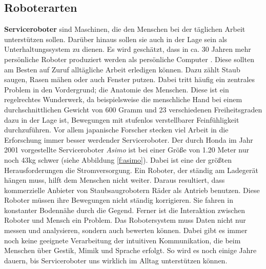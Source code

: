 \subsection{Roboterarten}
\textbf{Serviceroboter} sind Maschinen, die den Menschen bei der täglichen Arbeit unterstützen sollen. Darüber hinaus sollen sie auch in der Lage sein als Unterhaltungssystem zu dienen. Es wird geschätzt, dass in ca. 30 Jahren mehr persönliche Roboter produziert werden als persönliche Computer \cite{Haun2007}.
Diese sollten am Besten auf Zuruf alltägliche Arbeit erledigen können. Dazu zählt Staub saugen, Rasen mähen oder auch Fenster putzen. Dabei tritt häufig ein zentrales Problem in den Vordergrund; die Anatomie des Menschen. Diese ist ein regelrechtes Wunderwerk, da beispielsweise die menschliche Hand bei einem durchschnittlichen Gewicht von 600 Gramm und 23 verschiedenen Freiheitsgraden dazu in der Lage ist, Bewegungen mit stufenlos verstellbarer Feinfühligkeit durchzuführen. Vor allem japanische Forscher stecken viel Arbeit in die Erforschung immer besser werdender Serviceroboter. Der durch Honda im Jahr 2001 vorgestellte Serviceroboter \textit{Asimo} ist bei einer Größe von 1.20 Meter nur noch 43kg schwer (siehe Abbildung \ref{f:asimo}).
Dabei ist eine der größten Herausforderungen die Stromversorgung. Ein Roboter, der ständig am Ladegerät hängen muss, hilft dem Menschen nicht weiter. Daraus resultiert, dass kommerzielle Anbieter von Staubsaugrobotern Räder als Antrieb benutzen. Diese Roboter müssen ihre Bewegungen nicht ständig korrigieren. Sie fahren in konstanter Bodennähe durch die Gegend. Ferner ist die Interaktion zwischen Roboter und Mensch ein Problem. Das Robotersystem muss Daten nicht nur messen und analysieren, sondern auch bewerten können. Dabei gibt es immer noch keine geeignete Verarbeitung der intuitiven Kommunikation, die beim Menschen über Gestik, Mimik und Sprache erfolgt. So wird es noch einige Jahre dauern, bis Serviceroboter uns wirklich im Alltag unterstützen können.
